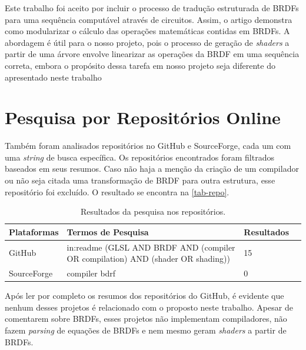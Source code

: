 Este trabalho foi aceito por incluir o processo de tradução estruturada de BRDFs para uma sequência computável através de circuitos. Assim, o artigo demonstra como modularizar o cálculo das operações matemáticas contidas em BRDFs. A abordagem é útil para o nosso projeto, pois o processo de geração de \textit{shaders} a partir de uma árvore envolve linearizar as operações da BRDF em uma sequência correta, embora o propósito dessa tarefa em nosso projeto seja diferente do apresentado neste trabalho


\section{Pesquisa por Repositórios Online}
Também foram analisados repositórios no GitHub e SourceForge, cada um com uma \textit{string} de busca específica. Os repositórios encontrados foram filtrados baseados em seus resumos. Caso não haja a menção da criação de um compilador ou não seja citada uma transformação de BRDF para outra estrutura, esse repositório foi excluído. O resultado se encontra na \autoref{tab-repo}.






\begin{table}[H]
\ABNTEXfontereduzida
\caption[bases]{\small Resultados da pesquisa nos repositórios.}
\label{tab-repo}
\begin{tabular}{p{2.6cm}|p{6.0cm}|p{2.25cm}|p{3.40cm}}
   \textbf{Plataformas} & \textbf{Termos de Pesquisa}  & \textbf{Resultados}\\
   \hline
   GitHub
   &
   in:readme (GLSL AND BRDF AND  (compiler OR compilation) AND (shader OR shading))
   & 15
   \\ \hline
   SourceForge
   &
   compiler bdrf
   & 0
\end{tabular}
\end{table}




Após ler por completo os resumos dos repositórios do GitHub, é evidente que nenhum desses projetos é relacionado com o proposto neste trabalho. Apesar de comentarem sobre BRDFs, esses projetos não implementam compiladores, não fazem \textit{parsing} de equações de BRDFs e nem mesmo geram \textit{shaders} a partir de BRDFs.

